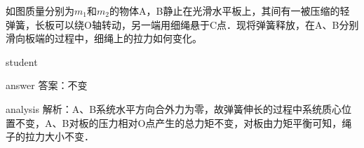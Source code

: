 \begin{example}
	如图质量分别为$ m_1 $和$ m_2 $的物体A，B静止在光滑水平板上，其间有一被压缩的轻弹簧，长板可以绕O轴转动，另一端用细绳悬于C点．现将弹簧释放，在A、B分别滑向板端的过程中，细绳上的拉力如何变化。
	
	\begin{taggedblock}{student}
		\vspace*{2cm}
	\end{taggedblock}
	
	
	\begin{taggedblock}{answer}
		答案：不变
	\end{taggedblock}
	
	
	\begin{taggedblock}{analysis}
		解析：A、B系统水平方向合外力为零，故弹簧伸长的过程中系统质心位置不变，A、B对板的压力相对O点产生的总力矩不变，对板由力矩平衡可知，绳子的拉力大小不变．
	\end{taggedblock}
\end{example}

